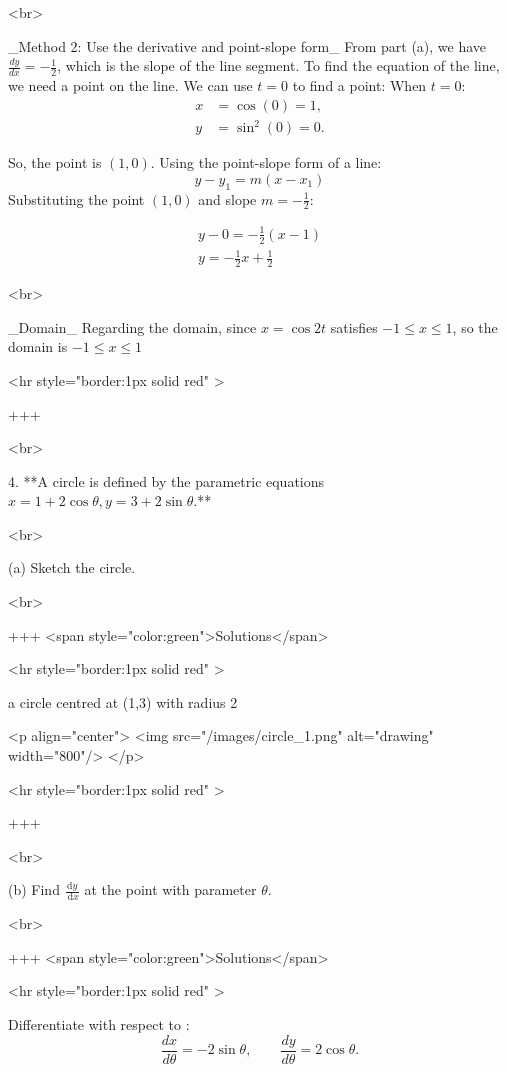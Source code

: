 <br>


_Method 2: Use the derivative and point-slope form_
From part (a), we have $\frac{dy}{dx} = -\frac{1}{2}$, which is the slope of the line segment. To find the equation of the line, we need a point on the line. We can use $t=0$ to find a point:
When $t=0$:
\begin{align*}
x &= \cos(0) = 1, \\
y &= \sin^2(0) = 0.
\end{align*}

So, the point is $(1, 0)$. Using the point-slope form of a line:
$$
y - y_1 = m(x - x_1)
$$
Substituting the point $(1, 0)$ and slope $m = -\frac{1}{2}$:

$$
\begin{align*}
y - 0 = -\frac{1}{2}(x - 1)\\
y = -\frac{1}{2}x  + \frac{1}{2}
\end{align*}
$$

<br>

_Domain_
Regarding the domain, since $x=\cos 2t$ satisfies $-1\le x\le 1$, so the domain is $-1\le x\le 1$

<hr style="border:1px solid red" >

+++

<br>

4. **A circle is defined by the parametric equations $x=1+2 \cos \theta, y=3+2 \sin \theta$.**

<br>

(a) Sketch the circle.

<br>

+++ <span style="color:green">Solutions</span>

<hr style="border:1px solid red" >

a circle centred at (1,3) with radius 2

<p align="center">
<img src="/images/circle_1.png" alt="drawing" width="800"/>
</p>

<hr style="border:1px solid red" >

+++

<br>


(b) Find $\frac{\mathrm{d} y}{\mathrm{~d} x}$ at the point with parameter $\theta$.

<br>

+++ <span style="color:green">Solutions</span>

<hr style="border:1px solid red" >

Differentiate with respect to \theta:
$$
\frac{dx}{d\theta} = -2\sin\theta,\qquad \frac{dy}{d\theta} = 2\cos\theta.
$$

